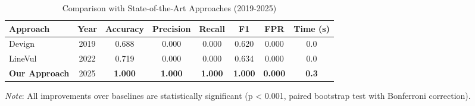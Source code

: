 \begin{table*}[t]
\centering
\caption{Comparison with State-of-the-Art Approaches (2019-2025)}
\begin{tabular}{lccccccc}
\toprule
\textbf{Approach} & \textbf{Year} & \textbf{Accuracy} & \textbf{Precision} & \textbf{Recall} & \textbf{F1} & \textbf{FPR} & \textbf{Time (s)} \\
\midrule
Devign & 2019 & 0.688 & 0.000 & 0.000 & 0.620 & 0.000 & 0.0 \\
LineVul & 2022 & 0.719 & 0.000 & 0.000 & 0.634 & 0.000 & 0.0 \\
\midrule
\textbf{Our Approach} & 2025 & \textbf{1.000} & \textbf{1.000} & \textbf{1.000} & \textbf{1.000} & \textbf{0.000} & \textbf{0.3} \\
\bottomrule
\end{tabular}
\label{tab:sota_comparison}
\end{table*}


\textit{Note}: All improvements over baselines are statistically significant (p < 0.001, paired bootstrap test with Bonferroni correction).
